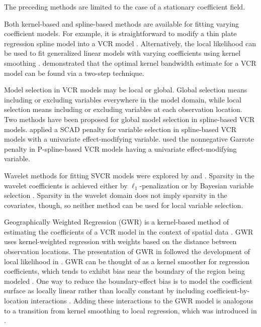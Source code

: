 \documentclass[authoryear, review, 11pt]{elsarticle}
\begin{document}
	The preceding methods are limited to the case of a stationary coefficient field.

	Both kernel-based and spline-based methods are available for fitting varying coefficient models. For example, it is straightforward to modify a thin plate regression spline model into a VCR model \citep{Wood:2006}. Alternatively, the local likelihood can be used to fit generalized linear models with varying coefficients using kernel smoothing \citep{Loader:1999}. \cite{Fan:1999} demonstrated that the optimal kernel bandwidth estimate for a VCR model can be found via a two-step technique.
	
	Model selection in VCR models may be local or global. Global selection means including or excluding variables everywhere in the model domain, while local selection means including or excluding variables at each observation location. Two methods have been proposed for global model selection in spline-based VCR models. \cite{Wang:2008a} applied a SCAD penalty \citep{Fan:2001} for variable selection in spline-based VCR models with a univariate effect-modifying variable. \cite{Antoniadis:2012a} used the nonnegative Garrote penalty \citep{Breiman:1995} in P-spline-based VCR models having a univariate effect-modifying variable.
	
	Wavelet methods for fitting SVCR models were explored by \cite{Shang-2011} and \cite{Zhang-2011}. Sparsity in the wavelet coefficients is achieved either by $\ell_1$-penalization \citep{Shang-2011} or by Bayesian variable selection \citep{Zhang-2011}. Sparsity in the wavelet domain does not imply sparsity in the covariates, though, so neither method can be used for local variable selection.

	Geographically Weighted Regression (GWR) is a kernel-based method of estimating the coefficients of a VCR model in the context of spatial data \citep{Brundson:1998a, Fotheringham:2002}. GWR uses kernel-weighted regression with weights based on the distance between observation locations. The presentation of GWR in \cite{Fotheringham:2002} followed the development of local likelihood in \cite{Loader:1999}. GWR can be thought of as a kernel smoother for regression coefficients, which tends to exhibit bias near the boundary of the region being modeled \citep{Hastie:1993b}. One way to reduce the boundary-effect bias is to model the coefficient surface as locally linear rather than locally constant by including coefficient-by-location interactions \citep{Hastie:1993b}. Adding these interactions to the GWR model is analogous to a transition from kernel smoothing to local regression, which was introduced in \cite{Wang:2008b}.
	
\end{document}
